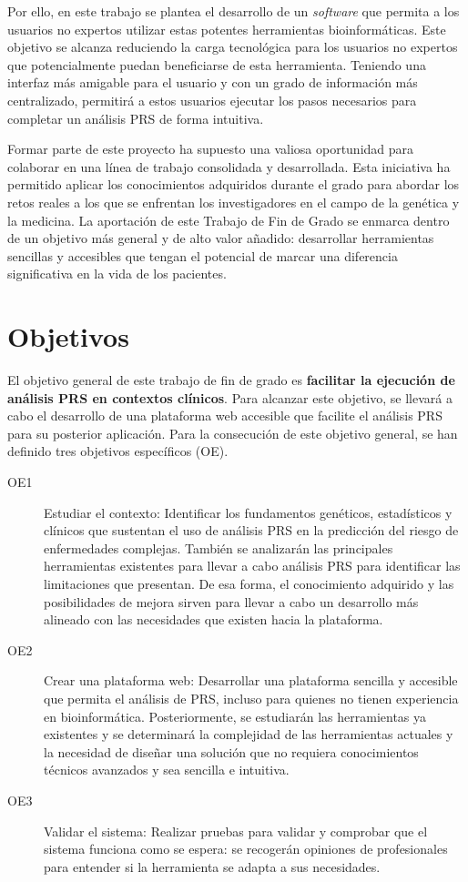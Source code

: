 Por ello, en este trabajo se plantea el desarrollo de un \textit{software} que permita a los usuarios no expertos utilizar estas potentes herramientas bioinformáticas. Este objetivo se alcanza reduciendo la carga tecnológica para los usuarios no expertos que potencialmente puedan beneficiarse de esta herramienta. Teniendo una interfaz más amigable para el usuario y con un grado de información más centralizado, permitirá a estos usuarios ejecutar los pasos necesarios para completar un análisis PRS de forma intuitiva.

Formar parte de este proyecto ha supuesto una valiosa oportunidad para colaborar en una línea de trabajo consolidada y desarrollada. Esta iniciativa ha permitido aplicar los conocimientos adquiridos durante el grado para abordar los retos reales a los que se enfrentan los investigadores en el campo de la genética y la medicina. La aportación de este Trabajo de Fin de Grado se enmarca dentro de un objetivo más general y de alto valor añadido: desarrollar herramientas sencillas y accesibles que tengan el potencial de marcar una diferencia significativa en la vida de los pacientes.

\section{Objetivos}

El objetivo general de este trabajo de fin de grado es \textbf{facilitar la ejecución de análisis PRS en contextos clínicos}. Para alcanzar este objetivo, se llevará a cabo el desarrollo de una plataforma web accesible que facilite el análisis PRS para su posterior aplicación. Para la consecución de este objetivo general, se han definido tres objetivos específicos (OE).
\begin{description}
    \item[OE1] Estudiar el contexto: Identificar los fundamentos genéticos, estadísticos y clínicos que sustentan el uso de análisis PRS en la predicción del riesgo de enfermedades complejas. También se analizarán las principales herramientas existentes para llevar a cabo análisis PRS para identificar las limitaciones que presentan. De esa forma, el conocimiento adquirido y las posibilidades de mejora sirven para llevar a cabo un desarrollo más alineado con las necesidades que existen hacia la plataforma.
    \item[OE2] Crear una plataforma web: Desarrollar una plataforma sencilla y accesible que permita el análisis de PRS, incluso para quienes no tienen experiencia en bioinformática. Posteriormente, se estudiarán las herramientas ya existentes y se determinará la complejidad de las herramientas actuales y la necesidad de diseñar una solución que no requiera conocimientos técnicos avanzados y sea sencilla e intuitiva.
    \item[OE3] Validar el sistema: Realizar pruebas para validar y comprobar que el sistema funciona como se espera: se recogerán opiniones de profesionales para entender si la herramienta se adapta a sus necesidades.
\end{description}

